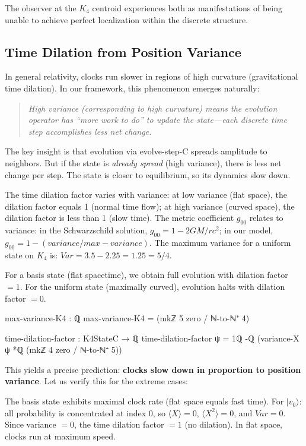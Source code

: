 \documentclass[11pt,a4paper]{book}
\def\texttt#1{#1}%
\def\text#1{#1}%
\begin{document}
The observer at the $K_4$ centroid experiences both as manifestations of
being unable to achieve perfect localization within the discrete structure.

\subsection{Time Dilation from Position Variance}

In general relativity, clocks run slower in regions of high curvature 
(gravitational time dilation). In our framework, this phenomenon emerges naturally:
\begin{quote}
\emph{High variance (corresponding to high curvature) means the evolution operator has ``more work to do''
to update the state---each discrete time step accomplishes less net change.}
\end{quote}

The key insight is that evolution via \texttt{evolve-step-C} spreads amplitude to neighbors.
But if the state is \emph{already spread} (high variance), there is less net change
per step. The state is closer to equilibrium, so its dynamics slow down.

The time dilation factor varies with variance: at low variance (flat space), the dilation factor equals 1 (normal time flow); at high variance (curved space), the dilation factor is less than 1 (slow time). The metric coefficient $g_{00}$ relates to variance: in the Schwarzschild solution, $g_{00} = 1 - 2GM/rc^2$; in our model, $g_{00} = 1 - (\text{variance}/\text{max-variance})$. The maximum variance for a uniform state on $K_4$ is: $\text{Var} = 3.5 - 2.25 = 1.25 = 5/4$.

For a basis state (flat spacetime), we obtain full evolution with dilation factor $= 1$. For the uniform state (maximally curved), evolution halts with dilation factor $= 0$.

\begin{code}
max-variance-K4 : ℚ
max-variance-K4 = (mkℤ 5 zero / ℕ-to-ℕ⁺ 4)

time-dilation-factor : K4StateC → ℚ
time-dilation-factor ψ = 1ℚ -ℚ (variance-X ψ *ℚ (mkℤ 4 zero / ℕ-to-ℕ⁺ 5))
\end{code}

This yields a precise prediction: \textbf{clocks slow down in proportion to 
position variance}. Let us verify this for the extreme cases:

The basis state exhibits maximal clock rate (flat space equals fast time). For $|v_0\rangle$: all probability is concentrated at index 0, so $\langle X\rangle = 0$, $\langle X^2\rangle = 0$, and $\text{Var} = 0$. Since variance $= 0$, the time dilation factor $= 1$ (no dilation). In flat space, clocks run at maximum speed.
\end{document}
